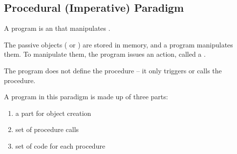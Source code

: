 \documentclass[\main/notes.tex]{subfiles}
\begin{document}
			\subsection{Procedural (Imperative) Paradigm}
				A program is an  that manipulates .

				The passive objects ( or ) are stored in memory, and a program manipulates them. To manipulate them, the program issues an action, called a .

				The program does not define the procedure -- it only triggers or calls the procedure.

				A program in this paradigm is made up of three parts:
				\begin{enumerate}[nosep]
					\item a part for object creation
					\item set of procedure calls
					\item set of code for each procedure
				\end{enumerate}
\end{document}
